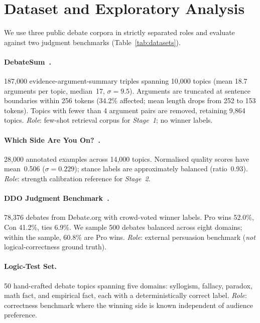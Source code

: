 \documentclass[11pt,twocolumn,letterpaper]{article}
\newcommand{\stage}[1]{\textit{Stage~#1}}
\newcommand{\DebateSumTopics}{10{,}000}
\newcommand{\DebateSumArgs}{187{,}000}
\newcommand{\WhichSideTopics}{14{,}000}
\newcommand{\WhichSideArgs}{28{,}000}
\newcommand{\DDOTotal}{78{,}376}
\newcommand{\DDOSample}{500}
\newcommand{\NTopicsKept}{9{,}864}
\newcommand{\TruncLimit}{256}
\newcommand{\MinArgPairs}{4}
\newcommand{\AptMean}{18.7}
\newcommand{\AptMedian}{17}
\newcommand{\AptStd}{9.5}
\newcommand{\PctArgsTrunc}{34.2}
\newcommand{\MeanRawTokens}{252}
\newcommand{\MeanTruncTokens}{153}
\newcommand{\QualityMean}{0.506}
\newcommand{\QualityStd}{0.229}
\newcommand{\StanceBalance}{0.93}
\newcommand{\DDOProWin}{52.0}
\newcommand{\DDOConWin}{41.2}
\newcommand{\DDOTie}{6.9}
\newcommand{\DDOSamplePro}{60.8}
\begin{document}
\section{Dataset and Exploratory Analysis}
\label{sec:data}

We use three public debate corpora in strictly separated roles and evaluate
against two judgment benchmarks (Table~\ref{tab:datasets}).

\paragraph{DebateSum~\citep{roush2020debatesum}.}
\DebateSumArgs{} evidence-argument-summary triples spanning \DebateSumTopics{}
topics (mean \AptMean{} arguments per topic, median~\AptMedian,
$\sigma{=}\AptStd$).
Arguments are truncated at sentence boundaries within \TruncLimit{} tokens
(\PctArgsTrunc\% affected; mean length drops from \MeanRawTokens{} to
\MeanTruncTokens{} tokens).
Topics with fewer than \MinArgPairs{} argument pairs are removed, retaining
\NTopicsKept{} topics.
\textit{Role}: few-shot retrieval corpus for \stage{1}; no winner labels.

\paragraph{Which Side Are You On?~\citep{li2024whichside}.}
\WhichSideArgs{} annotated examples across \WhichSideTopics{} topics.
Normalised quality scores have mean~\QualityMean{} ($\sigma{=}\QualityStd$);
stance labels are approximately balanced (ratio~\StanceBalance).
\textit{Role}: strength calibration reference for \stage{2}.

\paragraph{DDO Judgment Benchmark~\citep{durmus2019ddo}.}
\DDOTotal{} debates from Debate.org with crowd-voted winner labels.
Pro wins \DDOProWin\%, Con \DDOConWin\%, ties \DDOTie\%.
We sample \DDOSample{} debates balanced across eight domains; within the
sample, \DDOSamplePro\% are Pro wins.
\textit{Role}: external persuasion benchmark (\emph{not} logical-correctness
ground truth).

\paragraph{Logic-Test Set.}
50 hand-crafted debate topics spanning five domains: syllogism, fallacy,
paradox, math fact, and empirical fact, each with a deterministically
correct label.
\textit{Role}: correctness benchmark where the winning side is known
independent of audience preference.
\end{document}

